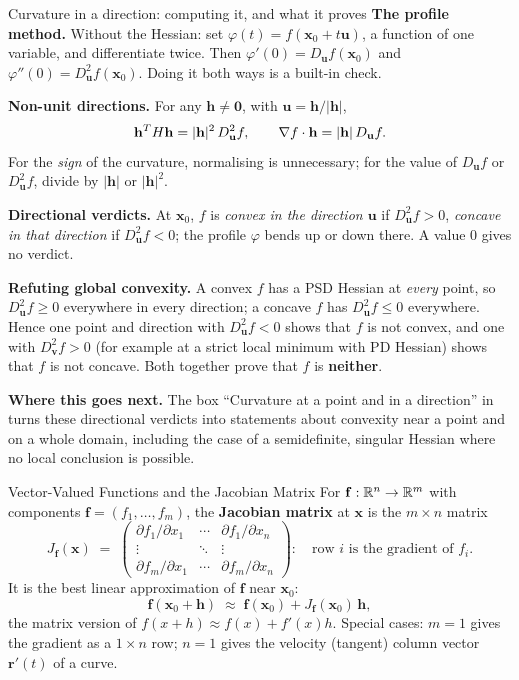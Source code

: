 \begin{rulebox}{Curvature in a direction: computing it, and what it proves}
\textbf{The profile method.} Without the Hessian: set
$\varphi(t)=f(\mathbf{x}_{0}+t\mathbf{u})$, a function of one variable,
and differentiate twice. Then $\varphi'(0)=D_{\mathbf{u}}f(\mathbf{x}_{0})$
and $\varphi''(0)=D^{2}_{\mathbf{u}}f(\mathbf{x}_{0})$. Doing it both ways
is a built-in check.

\textbf{Non-unit directions.} For any $\mathbf{h}\neq\mathbf{0}$, with
$\mathbf{u}=\mathbf{h}/|\mathbf{h}|$,
\[
  \mathbf{h}^{T}H\mathbf{h}=|\mathbf{h}|^{2}\,D^{2}_{\mathbf{u}}f,
  \qquad
  \nabla f\cdot\mathbf{h}=|\mathbf{h}|\,D_{\mathbf{u}}f .
\]
For the \emph{sign} of the curvature, normalising is unnecessary; for the
value of $D_{\mathbf{u}}f$ or $D^{2}_{\mathbf{u}}f$, divide by $|\mathbf{h}|$
or $|\mathbf{h}|^{2}$.

\textbf{Directional verdicts.} At $\mathbf{x}_{0}$, $f$ is
\emph{convex in the direction $\mathbf{u}$} if $D^{2}_{\mathbf{u}}f>0$,
\emph{concave in that direction} if $D^{2}_{\mathbf{u}}f<0$; the profile
$\varphi$ bends up or down there. A value $0$ gives no verdict.

\textbf{Refuting global convexity.} A convex $f$ has a PSD Hessian at
\emph{every} point, so $D^{2}_{\mathbf{u}}f\ge0$ everywhere in every
direction; a concave $f$ has $D^{2}_{\mathbf{u}}f\le0$ everywhere. Hence one
point and direction with $D^{2}_{\mathbf{u}}f<0$ shows that $f$ is not
convex, and one with $D^{2}_{\mathbf{v}}f>0$ (for example at a strict local
minimum with PD Hessian) shows that $f$ is not concave. Both together prove
that $f$ is \textbf{neither}.

\textbf{Where this goes next.} The box ``Curvature at a point and in a
direction'' in  turns these directional verdicts into
statements about convexity near a point and on a whole domain, including
the case of a semidefinite, singular Hessian where no local conclusion is
possible.
\end{rulebox}

\begin{rulebox}{Vector-Valued Functions and the Jacobian Matrix}
For $\mathbf{f}:\mathbb{R}^{n}\to\mathbb{R}^{m}$ with components
$\mathbf{f}=(f_{1},\ldots,f_{m})$, the \textbf{Jacobian matrix} at
$\mathbf{x}$ is the $m\times n$ matrix
\[
  J_{\mathbf{f}}(\mathbf{x}) \;=\;
  \begin{pmatrix}
    \partial f_{1}/\partial x_{1} & \cdots & \partial f_{1}/\partial x_{n}\\
    \vdots & \ddots & \vdots\\
    \partial f_{m}/\partial x_{1} & \cdots & \partial f_{m}/\partial x_{n}
  \end{pmatrix}:
  \quad\text{row $i$ is the gradient of $f_{i}$.}
\]
It is the best linear approximation of $\mathbf{f}$ near $\mathbf{x}_{0}$:
\[
  \mathbf{f}(\mathbf{x}_{0}+\mathbf{h})
  \;\approx\; \mathbf{f}(\mathbf{x}_{0})
  +J_{\mathbf{f}}(\mathbf{x}_{0})\,\mathbf{h} ,
\]
the matrix version of $f(x+h)\approx f(x)+f'(x)h$. Special cases: $m=1$
gives the gradient as a $1\times n$ row; $n=1$ gives the velocity
(tangent) column vector $\mathbf{r}'(t)$ of a curve.
\end{rulebox}


